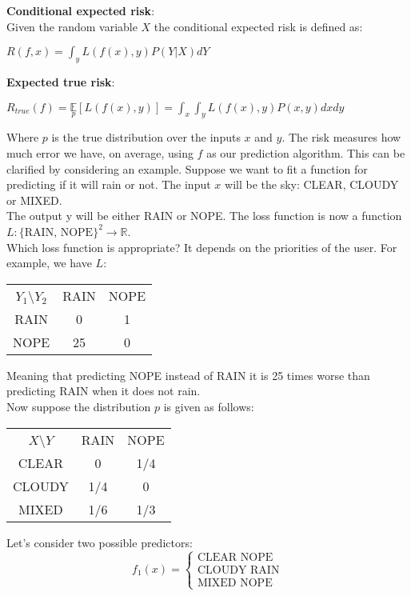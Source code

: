 \documentclass[twoside]{article}
\begin{document}
\textbf{Conditional expected risk}:\\
Given the random variable $X$ the conditional expected risk is defined as:
\begin{center}
    $R(f,x) = \int_y L(f(x), y)P(Y | X) dY$
\end{center}
\textbf{Expected true risk}:
\begin{center}
    $R_{true}(f) = \underset{p}{\mathbb{E}}[L(f(x), y)] = \int_x\int_y L(f(x), y)P(x, y) dx dy$
\end{center}
Where $p$ is the true distribution over the inputs $x$ and $y$. The risk measures how much error we have, on average,  using $f$ as our prediction algorithm.
\newpage
This can be clarified by considering an example. Suppose we want to fit a function for predicting if it will rain or not. The input $x$ will be the sky: CLEAR, CLOUDY or MIXED.\\
The output y will be either RAIN or NOPE. The loss function is now a function $L : \{\text{RAIN, NOPE}\}^2 \rightarrow \mathbb{R}$.\\
Which loss function is appropriate? It depends on the priorities of the user. For example, we have $L$:
\begin{center}
\begin{tabular}{ |c|c|c| } 
 \hline
 $Y_1$\textbackslash $Y_2$ & RAIN & NOPE \\ 
 RAIN & 0 & 1 \\ 
 NOPE & 25 & 0 \\ 
 \hline
\end{tabular}
\end{center}
Meaning that predicting NOPE instead of RAIN it is 25 times worse than predicting RAIN when it does not rain.\\
Now suppose the distribution $p$ is given as follows:
\begin{center}
\begin{tabular}{ |c|c|c| } 
 \hline
 $X$\textbackslash $Y$ & RAIN & NOPE \\ 
 CLEAR & 0 & 1/4 \\ 
 CLOUDY & 1/4 & 0 \\ 
 MIXED & 1/6 & 1/3 \\ 
 \hline
\end{tabular}
\end{center}
Let's consider two possible predictors:
\begin{equation*}
    f_1(x) = \begin{cases}
        \text{CLEAR NOPE} \\
        \text{CLOUDY RAIN} \\
        \text{MIXED NOPE} 
    \end{cases}
\end{equation*}
\end{document}
